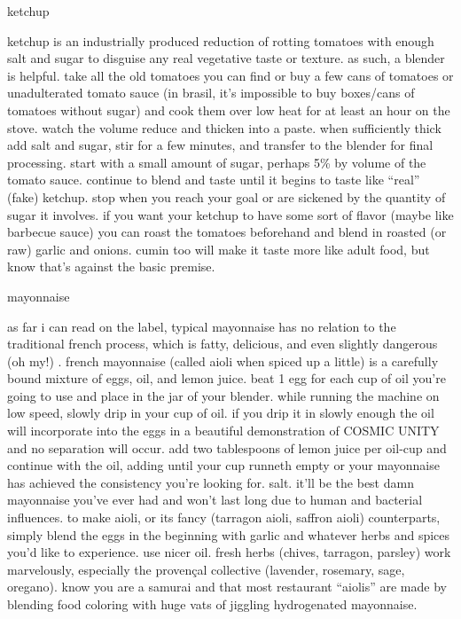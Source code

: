 ketchup

ketchup is an industrially produced reduction of rotting tomatoes with enough salt and sugar to disguise any real vegetative taste or texture. as such, a blender is helpful. take all the old tomatoes you can find or buy a few cans of tomatoes or unadulterated tomato sauce (in brasil, it's impossible to buy boxes/cans of tomatoes without sugar) and cook them over low heat for at least an hour on the stove. watch the volume reduce and thicken into a paste. when sufficiently thick add salt and sugar, stir for a few minutes, and transfer to the blender for final processing. start with a small amount of sugar, perhaps 5\% by volume of the tomato sauce. continue to blend and taste until it begins to taste like ``real'' (fake) ketchup. stop when you reach your goal or are sickened by the quantity of sugar it involves.
	if you want your ketchup to have some sort of flavor (maybe like barbecue sauce) you can roast the tomatoes beforehand and blend in roasted (or raw) garlic and onions. cumin too will make it taste more like adult food, but know that's against the basic premise.

mayonnaise

as far i can read on the label, typical mayonnaise has no relation to the traditional french process, which is fatty, delicious, and even slightly dangerous (oh my!) . french mayonnaise (called aioli when spiced up a little) is a carefully bound mixture of eggs, oil, and lemon juice. beat 1 egg for each cup of oil you're going to use and place in the jar of your blender. while running the machine on low speed, slowly drip in your cup of oil. if you drip it in slowly enough the oil will incorporate into the eggs in a beautiful demonstration of COSMIC UNITY and no separation will occur. add two tablespoons of lemon juice per oil-cup and continue with the oil, adding until your cup runneth empty or your mayonnaise has achieved the consistency you're looking for. salt. it'll be the best damn mayonnaise you've ever had and won't last long due to human and bacterial influences.
	to make aioli, or its fancy (tarragon aioli, saffron aioli) counterparts, simply blend the eggs in the beginning with garlic and whatever herbs and spices you'd like to experience. use nicer oil. fresh herbs (chives, tarragon, parsley) work marvelously, especially the proven\c{c}al collective (lavender, rosemary, sage, oregano). know you are a samurai and that most restaurant ``aiolis'' are made by blending food coloring with huge vats of jiggling hydrogenated mayonnaise.

